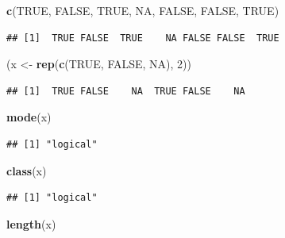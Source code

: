 \documentclass[10pt,b5paper,krantz1]{krantz}
\newenvironment{Shaded}{\begin{snugshade}}{\end{snugshade}}
\newcommand{\DecValTok}[1]{\textcolor[rgb]{0.06,0.06,0.06}{#1}}
\newcommand{\KeywordTok}[1]{\textcolor[rgb]{0.27,0.27,0.27}{\textbf{#1}}}
\newcommand{\NormalTok}[1]{#1}
\newcommand{\OtherTok}[1]{\textcolor[rgb]{0.37,0.37,0.37}{#1}}
\newcommand{\StringTok}[1]{\textcolor[rgb]{0.5,0.5,0.5}{#1}}
\begin{document}
\begin{Shaded}
\begin{Highlighting}[]
\KeywordTok{c}\NormalTok{(}\OtherTok{TRUE}\NormalTok{, }\OtherTok{FALSE}\NormalTok{, }\OtherTok{TRUE}\NormalTok{, }\OtherTok{NA}\NormalTok{, }\OtherTok{FALSE}\NormalTok{, }\OtherTok{FALSE}\NormalTok{, }\OtherTok{TRUE}\NormalTok{)}
\end{Highlighting}
\end{Shaded}

\begin{verbatim}
## [1]  TRUE FALSE  TRUE    NA FALSE FALSE  TRUE
\end{verbatim}

\begin{Shaded}
\begin{Highlighting}[]
\NormalTok{(x <-}\StringTok{ }\KeywordTok{rep}\NormalTok{(}\KeywordTok{c}\NormalTok{(}\OtherTok{TRUE}\NormalTok{, }\OtherTok{FALSE}\NormalTok{, }\OtherTok{NA}\NormalTok{), }\DecValTok{2}\NormalTok{))}
\end{Highlighting}
\end{Shaded}

\begin{verbatim}
## [1]  TRUE FALSE    NA  TRUE FALSE    NA
\end{verbatim}

\begin{Shaded}
\begin{Highlighting}[]
\KeywordTok{mode}\NormalTok{(x)}
\end{Highlighting}
\end{Shaded}

\begin{verbatim}
## [1] "logical"
\end{verbatim}

\begin{Shaded}
\begin{Highlighting}[]
\KeywordTok{class}\NormalTok{(x)}
\end{Highlighting}
\end{Shaded}

\begin{verbatim}
## [1] "logical"
\end{verbatim}

\begin{Shaded}
\begin{Highlighting}[]
\KeywordTok{length}\NormalTok{(x)}
\end{Highlighting}
\end{Shaded}
\end{document}
